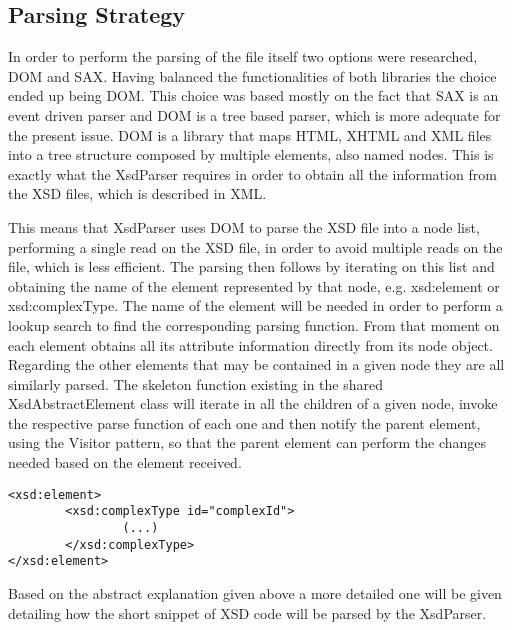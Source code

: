 \subsection{Parsing Strategy}
\label{sec:parsingstrategy}

In order to perform the parsing of the file itself two options were researched, \ac{DOM} and \ac{SAX}. Having balanced the functionalities of both libraries the choice ended up being \ac{DOM}. This choice was based mostly on the fact that \ac{SAX} is an event driven parser and \ac{DOM} is a tree based parser, which is more adequate for the present issue. \ac{DOM} is a library that maps \ac{HTML}, \ac{XHTML} and \ac{XML} files into a tree structure composed by multiple elements, also named nodes. This is exactly what the XsdParser requires in order to obtain all the information from the \ac{XSD} files, which is described in \ac{XML}. 

\noindent
This means that XsdParser uses \ac{DOM} to parse the \ac{XSD} file into a node list, performing a single read on the \ac{XSD} file, in order to avoid multiple reads on the file, which is less efficient. The parsing then follows by iterating on this list and obtaining the name of the element represented by that node, e.g. xsd:element or xsd:complexType. The name of the element will be needed in order to perform a lookup search to find the corresponding parsing function. From that moment on each element obtains all its attribute information directly from its node object. Regarding the other elements that may be contained in a given node they are all similarly parsed. The skeleton function existing in the shared XsdAbstractElement class will iterate in all the children of a given node, invoke the respective parse function of each one and then notify the parent element, using the Visitor pattern, so that the parent element can perform the changes needed based on the element received.


\begin{minipage}{\linewidth}
\begin{lstlisting}[caption={Parsing Concrete Example},captionpos=b]
<xsd:element>
		<xsd:complexType id="complexId">
				(...)	
		</xsd:complexType>
</xsd:element>
\end{lstlisting}
\end{minipage}

\noindent
Based on the abstract explanation given above a more detailed one will be given detailing how the short snippet of \ac{XSD} code will be parsed by the XsdParser. 

